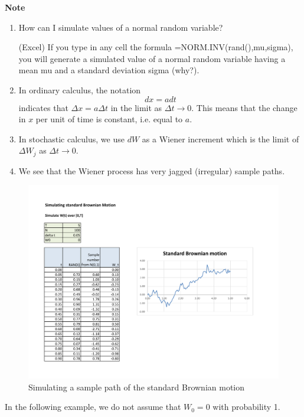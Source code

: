 \documentclass[
]{book}
\theoremstyle{definition}
\theoremstyle{definition}
\theoremstyle{definition}
\theoremstyle{definition}
\theoremstyle{remark}
\begin{document}
\textbf{Note}

\begin{enumerate}
\def\labelenumi{\arabic{enumi}.}
\item
  How can I simulate values of a normal random variable?

  (Excel) If you type in any cell the formula
  =NORM.INV(rand(),mu,sigma), you will generate a simulated value of a
  normal random variable having a mean mu and a standard deviation
  sigma (why?).
\item
  In ordinary calculus, the notation \[dx = a dt\] indicates that
  \(\Delta x = a \Delta t\) in the limit as \(\Delta t \rightarrow 0\).
  This means that the change in \(x\) per unit of time is constant, i.e.
  equal to \(a\).
\item
  In stochastic calculus, we use \(dW\) as a Wiener increment which is
  the limit of \(\Delta W_j\) as \(\Delta t \rightarrow 0\).
\item
  We see that the Wiener process has very jagged (irregular) sample
  paths.
\end{enumerate}

\begin{figure}
\hypertarget{fig:BM}{%
\centering
\includegraphics[width=8in,height=\textheight]{BM.pdf}
\caption{Simulating a sample path of the standard Brownian
motion}\label{fig:BM}
}
\end{figure}

In the following example, we do not assume that \(W_0 = 0\) with
probability 1.
\end{document}
